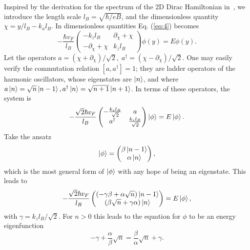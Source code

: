 Inspired by the derivation for the spectrum of the 2D Dirac Hamiltonian in~\cite{wehlingDiracMaterials2014}, we introduce the length scale $l_B = \sqrt{\hbar / eB}$, and the dimensionless quantity $\chi = y /l_{B} - k_x l_{B}$.
In dimensionless quantities Eq. (\ref{eq:4}) becomes
\begin{equation}
  -\frac{{\hbar v_F}}{l_{B}}
  \begin{pmatrix}
    -k_z l_B & \partial _{\chi } + \chi \\
    -\partial _{\chi } + \chi & k_z l_B
  \end{pmatrix}
  \phi(y)  =  E \phi(y).
\end{equation}
Let the operators \(a = \left( \chi + \partial _{\chi } \right) / \sqrt{2},\; a^{\dagger} = \left( \chi - \partial _{\chi } \right) /\sqrt{2}\).
One may easily verify the commutation relation $[a, a^{\dagger}] = 1$;
they are ladder operators of the harmonic oscillators, whose eigenstates are $\ket{n}$, and where $a\ket{n} = \sqrt{n}\ket{n-1}, a^{\dagger} \ket{n} = \sqrt{n+1} \ket{n+1}$.
In terms of these operators, the system is
\begin{equation}
  -\frac{\sqrt{2} \hbar v_F}{l_B}
  \begin{pmatrix}
    -\frac{k_zl_B}{\sqrt{2}} & a\\
    a^{\dagger} & \frac{k_zl_B}{\sqrt{2}}
  \end{pmatrix}
  \ket{\phi } = E \ket{\phi }.
\end{equation}
Take the ansatz
\begin{equation}
  \ket{\phi } =
  \begin{pmatrix}
    \beta \ket{n-1}\\
    \alpha  \ket{n}
  \end{pmatrix},
\end{equation}
which is the most general form of $\ket{\phi }$ with any hope of being an eigenstate.
This leads to
\begin{equation}
  -\frac{\sqrt{2} \hbar v_F}{l_B}
  \begin{pmatrix}
    \left( -\gamma \beta + \alpha \sqrt{n} \right) \ket{n-1}\\
    \left( \beta \sqrt{n} + \gamma \alpha \right) \ket{n}
  \end{pmatrix}
  = E \ket{\phi },
\end{equation}
with $\gamma  = k_zl_B / \sqrt{2}$.
For $n > 0$ this leads to the equation for $\phi $ to be an energy eigenfunction
\begin{equation}
  -\gamma + \frac{\alpha}{\beta } \sqrt{n} = \frac{\beta }{\alpha } \sqrt{n} + \gamma.
\end{equation}
